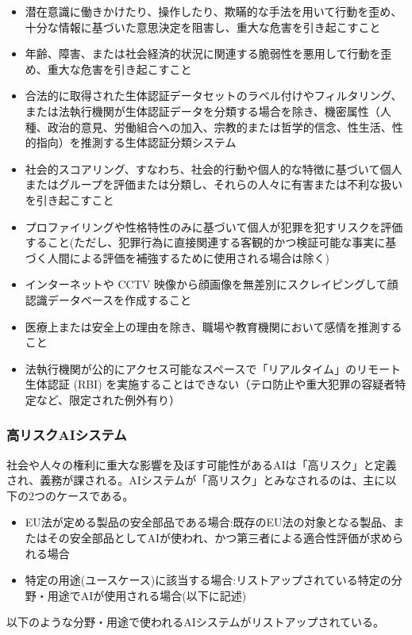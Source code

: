 \begin{itemize}
  \item 潜在意識に働きかけたり、操作したり、欺瞞的な手法を用いて行動を歪め、十分な情報に基づいた意思決定を阻害し、重大な危害を引き起こすこと
  \item 年齢、障害、または社会経済的状況に関連する脆弱性を悪用して行動を歪め、重大な危害を引き起こすこと
  \item 合法的に取得された生体認証データセットのラベル付けやフィルタリング、または法執行機関が生体認証データを分類する場合を除き、機密属性（人種、政治的意見、労働組合への加入、宗教的または哲学的信念、性生活、性的指向）を推測する生体認証分類システム
  \item 社会的スコアリング、すなわち、社会的行動や個人的な特徴に基づいて個人またはグループを評価または分類し、それらの人々に有害または不利な扱いを引き起こすこと
  \item プロファイリングや性格特性のみに基づいて個人が犯罪を犯すリスクを評価すること(ただし、犯罪行為に直接関連する客観的かつ検証可能な事実に基づく人間による評価を補強するために使用される場合は除く)
  \item インターネットや CCTV 映像から顔画像を無差別にスクレイピングして顔認識データベースを作成すること
  \item 医療上または安全上の理由を除き、職場や教育機関において感情を推測すること
  \item 法執行機関が公的にアクセス可能なスペースで「リアルタイム」のリモート生体認証 (RBI) を実施することはできない（テロ防止や重大犯罪の容疑者特定など、限定された例外有り）
\end{itemize}

\subsubsection{高リスクAIシステム}
社会や人々の権利に重大な影響を及ぼす可能性があるAIは「高リスク」と定義され、義務が課される。AIシステムが「高リスク」とみなされるのは、主に以下の2つのケースである。

\begin{itemize}
    \item EU法が定める製品の安全部品である場合:既存のEU法の対象となる製品、またはその安全部品としてAIが使われ、かつ第三者による適合性評価が求められる場合
    \item 特定の用途(ユースケース)に該当する場合:リストアップされている特定の分野・用途でAIが使用される場合(以下に記述)
\end{itemize}

以下のような分野・用途で使われるAIシステムがリストアップされている。

